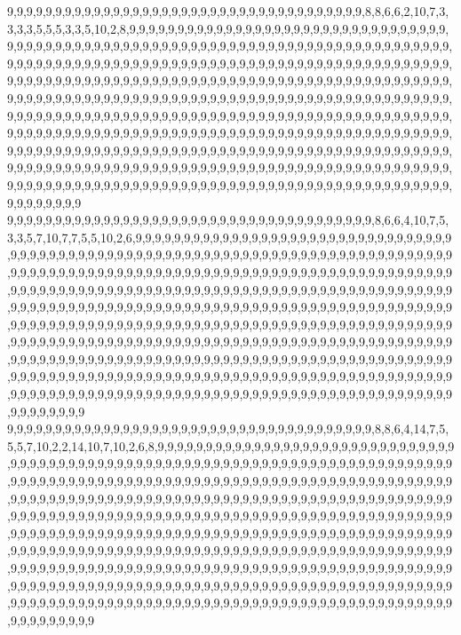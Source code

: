 9,9,9,9,9,9,9,9,9,9,9,9,9,9,9,9,9,9,9,9,9,9,9,9,9,9,9,9,9,9,9,9,9,9,9,9,9,8,8,6,6,2,10,7,3,3,3,3,5,5,5,3,3,5,10,2,8,9,9,9,9,9,9,9,9,9,9,9,9,9,9,9,9,9,9,9,9,9,9,9,9,9,9,9,9,9,9,9,9,9,9,9,9,9,9,9,9,9,9,9,9,9,9,9,9,9,9,9,9,9,9,9,9,9,9,9,9,9,9,9,9,9,9,9,9,9,9,9,9,9,9,9,9,9,9,9,9,9,9,9,9,9,9,9,9,9,9,9,9,9,9,9,9,9,9,9,9,9,9,9,9,9,9,9,9,9,9,9,9,9,9,9,9,9,9,9,9,9,9,9,9,9,9,9,9,9,9,9,9,9,9,9,9,9,9,9,9,9,9,9,9,9,9,9,9,9,9,9,9,9,9,9,9,9,9,9,9,9,9,9,9,9,9,9,9,9,9,9,9,9,9,9,9,9,9,9,9,9,9,9,9,9,9,9,9,9,9,9,9,9,9,9,9,9,9,9,9,9,9,9,9,9,9,9,9,9,9,9,9,9,9,9,9,9,9,9,9,9,9,9,9,9,9,9,9,9,9,9,9,9,9,9,9,9,9,9,9,9,9,9,9,9,9,9,9,9,9,9,9,9,9,9,9,9,9,9,9,9,9,9,9,9,9,9,9,9,9,9,9,9,9,9,9,9,9,9,9,9,9,9,9,9,9,9,9,9,9,9,9,9,9,9,9,9,9,9,9,9,9,9,9,9,9,9,9,9,9,9,9,9,9,9,9,9,9,9,9,9,9,9,9,9,9,9,9,9,9,9,9,9,9,9,9,9,9,9,9,9,9,9,9,9,9,9,9,9,9,9,9,9,9,9,9,9,9,9,9,9,9,9,9,9,9,9,9,9,9,9,9,9,9,9,9,9,9,9,9,9,9,9,9,9,9,9,9,9,9,9,9,9,9,9,9,9,9,9,9,9,9,9,9,9,9,9,9,9,9,9,9,9,9,9,9,9,9,9,9,9,9,9,9,9,9,9,9,9,9,9,9,9,9,9,9,9,9,9,9,9,9,9,9,9,9,9,9,9,9,9,9,9,9,9
9,9,9,9,9,9,9,9,9,9,9,9,9,9,9,9,9,9,9,9,9,9,9,9,9,9,9,9,9,9,9,9,9,9,9,9,9,9,8,6,6,4,10,7,5,3,3,5,7,10,7,7,5,5,10,2,6,9,9,9,9,9,9,9,9,9,9,9,9,9,9,9,9,9,9,9,9,9,9,9,9,9,9,9,9,9,9,9,9,9,9,9,9,9,9,9,9,9,9,9,9,9,9,9,9,9,9,9,9,9,9,9,9,9,9,9,9,9,9,9,9,9,9,9,9,9,9,9,9,9,9,9,9,9,9,9,9,9,9,9,9,9,9,9,9,9,9,9,9,9,9,9,9,9,9,9,9,9,9,9,9,9,9,9,9,9,9,9,9,9,9,9,9,9,9,9,9,9,9,9,9,9,9,9,9,9,9,9,9,9,9,9,9,9,9,9,9,9,9,9,9,9,9,9,9,9,9,9,9,9,9,9,9,9,9,9,9,9,9,9,9,9,9,9,9,9,9,9,9,9,9,9,9,9,9,9,9,9,9,9,9,9,9,9,9,9,9,9,9,9,9,9,9,9,9,9,9,9,9,9,9,9,9,9,9,9,9,9,9,9,9,9,9,9,9,9,9,9,9,9,9,9,9,9,9,9,9,9,9,9,9,9,9,9,9,9,9,9,9,9,9,9,9,9,9,9,9,9,9,9,9,9,9,9,9,9,9,9,9,9,9,9,9,9,9,9,9,9,9,9,9,9,9,9,9,9,9,9,9,9,9,9,9,9,9,9,9,9,9,9,9,9,9,9,9,9,9,9,9,9,9,9,9,9,9,9,9,9,9,9,9,9,9,9,9,9,9,9,9,9,9,9,9,9,9,9,9,9,9,9,9,9,9,9,9,9,9,9,9,9,9,9,9,9,9,9,9,9,9,9,9,9,9,9,9,9,9,9,9,9,9,9,9,9,9,9,9,9,9,9,9,9,9,9,9,9,9,9,9,9,9,9,9,9,9,9,9,9,9,9,9,9,9,9,9,9,9,9,9,9,9,9,9,9,9,9,9,9,9,9,9,9,9,9,9,9,9,9,9,9,9,9,9,9,9,9,9,9,9,9,9,9,9,9,9,9,9,9,9,9,9,9,9,9,9,9,9,9,9,9,9,9
9,9,9,9,9,9,9,9,9,9,9,9,9,9,9,9,9,9,9,9,9,9,9,9,9,9,9,9,9,9,9,9,9,9,9,9,9,9,8,8,6,4,14,7,5,5,5,7,10,2,2,14,10,7,10,2,6,8,9,9,9,9,9,9,9,9,9,9,9,9,9,9,9,9,9,9,9,9,9,9,9,9,9,9,9,9,9,9,9,9,9,9,9,9,9,9,9,9,9,9,9,9,9,9,9,9,9,9,9,9,9,9,9,9,9,9,9,9,9,9,9,9,9,9,9,9,9,9,9,9,9,9,9,9,9,9,9,9,9,9,9,9,9,9,9,9,9,9,9,9,9,9,9,9,9,9,9,9,9,9,9,9,9,9,9,9,9,9,9,9,9,9,9,9,9,9,9,9,9,9,9,9,9,9,9,9,9,9,9,9,9,9,9,9,9,9,9,9,9,9,9,9,9,9,9,9,9,9,9,9,9,9,9,9,9,9,9,9,9,9,9,9,9,9,9,9,9,9,9,9,9,9,9,9,9,9,9,9,9,9,9,9,9,9,9,9,9,9,9,9,9,9,9,9,9,9,9,9,9,9,9,9,9,9,9,9,9,9,9,9,9,9,9,9,9,9,9,9,9,9,9,9,9,9,9,9,9,9,9,9,9,9,9,9,9,9,9,9,9,9,9,9,9,9,9,9,9,9,9,9,9,9,9,9,9,9,9,9,9,9,9,9,9,9,9,9,9,9,9,9,9,9,9,9,9,9,9,9,9,9,9,9,9,9,9,9,9,9,9,9,9,9,9,9,9,9,9,9,9,9,9,9,9,9,9,9,9,9,9,9,9,9,9,9,9,9,9,9,9,9,9,9,9,9,9,9,9,9,9,9,9,9,9,9,9,9,9,9,9,9,9,9,9,9,9,9,9,9,9,9,9,9,9,9,9,9,9,9,9,9,9,9,9,9,9,9,9,9,9,9,9,9,9,9,9,9,9,9,9,9,9,9,9,9,9,9,9,9,9,9,9,9,9,9,9,9,9,9,9,9,9,9,9,9,9,9,9,9,9,9,9,9,9,9,9,9,9,9,9,9,9,9,9,9,9,9,9,9,9,9,9,9,9,9,9,9,9,9,9,9,9,9,9,9,9,9,9,9,9,9,9,9
